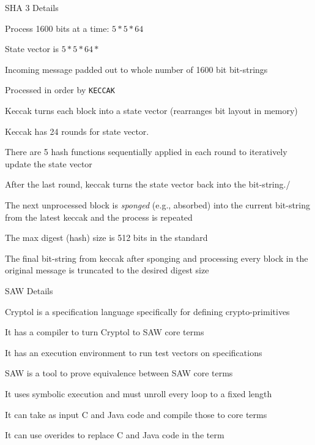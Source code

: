 SHA 3 Details
\begin{compactitem}
  \item Process 1600 bits at a time: $5 * 5 * 64$
  \item State vector is $5*5*64*$
  \item Incoming message padded out to whole number of 1600 bit bit-strings
  \item Processed in order by \texttt{KECCAK}
  \item Keccak turns each block into a state vector (rearranges bit layout in memory)
  \item Keccak has 24 rounds for state vector. 
  \item There are 5 hash functions sequentially applied in each round to iteratively update the state vector
  \item After the last round, keccak turns the state vector back into the bit-string./\item The next unprocessed block is \emph{sponged} (e.g., absorbed) into the current bit-string from the latest keccak and the process is repeated 
  \item The max digest (hash) size is 512 bits in the standard
  \item The final bit-string from keccak after sponging and processing every block in the original message is truncated to the desired digest size 
\end{compactitem}

SAW Details
\begin{compactitem}
  \item Cryptol is a specification language specifically for defining crypto-primitives
  \item It has a compiler to turn Cryptol to SAW core terms
  \item It has an execution environment to run test vectors on specifications
  \item SAW is a tool to prove equivalence between SAW core terms
  \item It uses symbolic execution and must unroll every loop to a fixed length
  \item It can take as input C and Java code and compile those to core terms
  \item It can use overides to replace C and Java code in the term
\end{compactitem}

